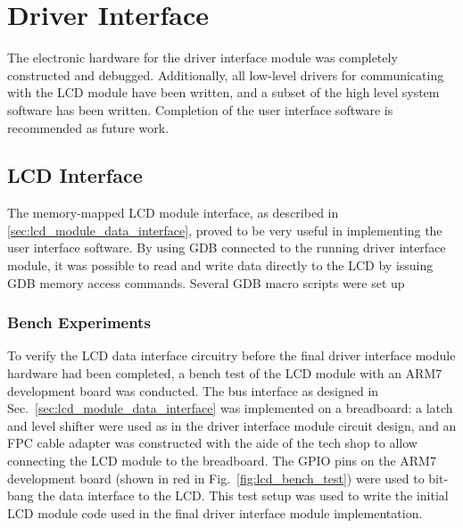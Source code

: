 \section{Driver Interface}

The electronic hardware for the driver interface module was completely constructed and debugged. Additionally, all low-level drivers for communicating with the LCD module have been written, and a subset of the high level system software has been written. Completion of the user interface software is recommended as future work.

\subsection{LCD Interface}

The memory-mapped LCD module interface, as described in \ref{sec:lcd_module_data_interface}, proved to be very useful in implementing the user interface software. By using GDB connected to the running driver interface module, it was possible to read and write data directly to the LCD by issuing GDB memory access commands. Several GDB macro scripts were set up

\subsubsection{Bench Experiments}

To verify the LCD data interface circuitry before the final driver interface module hardware had been completed, a bench test of the LCD module with an ARM7 development board was conducted. The bus interface as designed in Sec.\ \ref{sec:lcd_module_data_interface} was implemented on a breadboard: a latch and level shifter were used as in the driver interface module circuit design, and an FPC cable adapter was constructed with the aide of the tech shop to allow connecting the LCD module to the breadboard. The GPIO pins on the ARM7 development board (shown in red in Fig.\ \ref{fig:lcd_bench_test}) were used to bit-bang the data interface to the LCD. This test setup was used to write the initial LCD module code used in the final driver interface module implementation.

